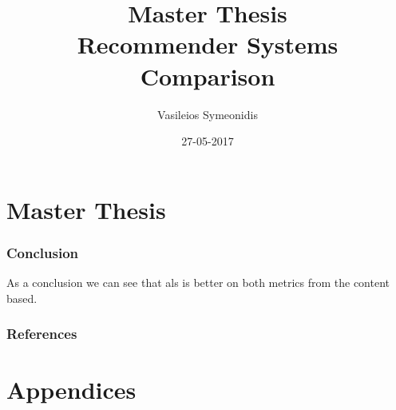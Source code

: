 \documentclass{article}
\title{Master Thesis \\ Recommender Systems Comparison}
\date{27-05-2017}
\author{Vasileios Symeonidis}
\begin{document}
\maketitle
\newpage
\tableofcontents
{}
\newpage
{}

\part{Master Thesis}





\section{Conclusion}
As a conclusion we can see that als is better on both metrics from the content based.

\newpage
\section{References}



\newpage
\appendix
\part{Appendices}








%	
%	
\end{document}
